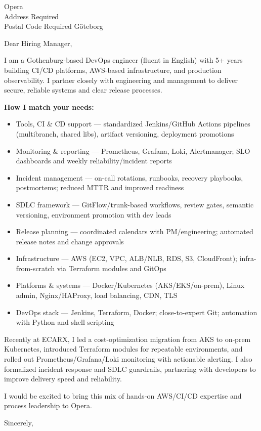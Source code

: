 \documentclass[a4paper,10pt]{letter}
\begin{document}
\pagestyle{empty}
\begin{letter}{Opera\\Address Required\\Postal Code Required Göteborg}
\opening{Dear Hiring Manager,}

I am a Gothenburg-based DevOps engineer (fluent in English) with 5+ years building CI/CD platforms, AWS-based infrastructure, and production observability. I partner closely with engineering and management to deliver secure, reliable systems and clear release processes.

\textbf{How I match your needs:}
\begin{itemize}[leftmargin=*]
\item Tools, CI \& CD support — standardized Jenkins/GitHub Actions pipelines (multibranch, shared libs), artifact versioning, deployment promotions
\item Monitoring \& reporting — Prometheus, Grafana, Loki, Alertmanager; SLO dashboards and weekly reliability/incident reports
\item Incident management — on-call rotations, runbooks, recovery playbooks, postmortems; reduced MTTR and improved readiness
\item SDLC framework — GitFlow/trunk-based workflows, review gates, semantic versioning, environment promotion with dev leads
\item Release planning — coordinated calendars with PM/engineering; automated release notes and change approvals
\item Infrastructure — AWS (EC2, VPC, ALB/NLB, RDS, S3, CloudFront); infra-from-scratch via Terraform modules and GitOps
\item Platforms \& systems — Docker/Kubernetes (AKS/EKS/on-prem), Linux admin, Nginx/HAProxy, load balancing, CDN, TLS
\item DevOps stack — Jenkins, Terraform, Docker; close-to-expert Git; automation with Python and shell scripting
\end{itemize}

Recently at ECARX, I led a cost-optimization migration from AKS to on‑prem Kubernetes, introduced Terraform modules for repeatable environments, and rolled out Prometheus/Grafana/Loki monitoring with actionable alerting. I also formalized incident response and SDLC guardrails, partnering with developers to improve delivery speed and reliability.

I would be excited to bring this mix of hands‑on AWS/CI/CD expertise and process leadership to Opera.

\closing{Sincerely,}
\signature{Hongzhi Li\\Ebbe Lieberathsgatan 27\\412 65 G\"{o}teborg\\hongzhili01@gmail.com\\0728384299\\2025.09.11}
\end{letter}
\end{document}
